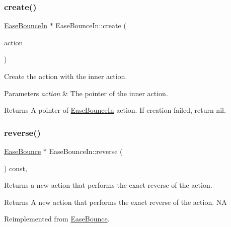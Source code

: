 \subsubsection{\texorpdfstring{create()}{create()}}
{\footnotesize\ttfamily \hyperlink{classEaseBounceIn}{Ease\+Bounce\+In} $\ast$ Ease\+Bounce\+In\+::create (\begin{DoxyParamCaption}\item[{\hyperlink{classActionInterval}{Action\+Interval} $\ast$}]{action }\end{DoxyParamCaption})\hspace{0.3cm}{\ttfamily [static]}}



Create the action with the inner action. 


\begin{DoxyParams}{Parameters}
{\em action} & The pointer of the inner action. \\
\hline
\end{DoxyParams}
\begin{DoxyReturn}{Returns}
A pointer of \hyperlink{classEaseBounceIn}{Ease\+Bounce\+In} action. If creation failed, return nil. 
\end{DoxyReturn}
\mbox{\label{classEaseBounceIn_aac86ecee50c41de2e0b4047cf8047949}} 
\subsubsection{\texorpdfstring{reverse()}{reverse()}}
{\footnotesize\ttfamily \hyperlink{classEaseBounce}{Ease\+Bounce} $\ast$ Ease\+Bounce\+In\+::reverse (\begin{DoxyParamCaption}\item[{void}]{ }\end{DoxyParamCaption}) const\hspace{0.3cm}{\ttfamily [override]}, {\ttfamily [virtual]}}

Returns a new action that performs the exact reverse of the action.

\begin{DoxyReturn}{Returns}
A new action that performs the exact reverse of the action.  NA 
\end{DoxyReturn}


Reimplemented from \hyperlink{classEaseBounce_abbd0a4bae312fa781f226cad16222773}{Ease\+Bounce}.

